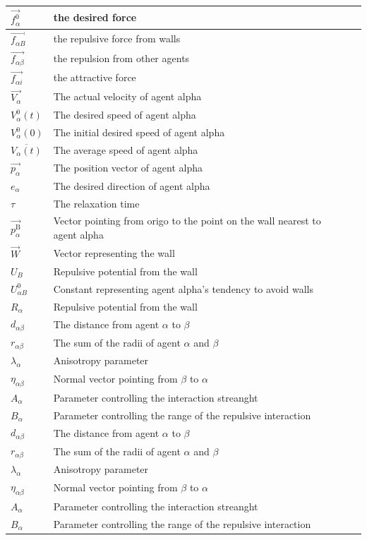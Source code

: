 \begin{center}
\begin{tabular}{lll}
\hline
$\vec{f_{\alpha}^{0}}$ & the desired force &\\
\hline
$\vec{f_{\alpha B}}$ & the repulsive force from walls &\\
\hline
$\vec{f_{\alpha \beta}}$ & the repulsion from other agents\\
\hline
$\vec{f_{\alpha i}}$& the attractive force\\
\hline
$\vec{V_{\alpha}}$ & The actual velocity of agent alpha &\\
\hline
$V_{\alpha}^{0}(t)$ & The desired speed of agent alpha &\\
\hline
$V_{\alpha}^{0}(0)$ & The initial desired speed of agent alpha &\\
\hline
$\overline{V_{\alpha}(t)}$ & The average speed of agent alpha &\\
\hline
$\vec{p_{\alpha}}$ & The position vector of agent alpha\\
\hline
$e_{\alpha}$& The desired direction of agent alpha\\
\hline
$\tau$& The relaxation time &\\
\hline
$\vec{p_{\alpha}^{\text{B}}}$& Vector pointing from origo to the point on the wall nearest to agent alpha &\\
\hline
$\vec{W}$& Vector representing the wall &\\
\hline
$U_{B}$ & Repulsive potential from the wall\\
\hline
$U^{0}_{\alpha B}$ & Constant representing agent alpha's tendency to avoid walls\\
\hline
$R_{\alpha}$& Repulsive potential from the wall\\
\hline
$d_{\alpha \beta}$& The distance from agent $\alpha$ to $\beta$ &\\
\hline
$r_{\alpha\beta}$& The sum of the radii of agent $\alpha$ and $\beta$ \\
\hline
$\lambda_{\alpha}$& Anisotropy parameter &\\
\hline
$\eta_{\alpha \beta}$& Normal vector pointing from $\beta$ to $\alpha$ \\
\hline
$A_{\alpha}$& Parameter controlling the interaction streanght \\
\hline
$B_{\alpha}$& Parameter controlling the range of the repulsive interaction  \\
\hline
$d_{\alpha \beta}$& The distance from agent $\alpha$ to $\beta$ &\\
\hline
$r_{\alpha\beta}$& The sum of the radii of agent $\alpha$ and $\beta$ \\
\hline
$\lambda_{\alpha}$& Anisotropy parameter &\\
\hline
$\eta_{\alpha \beta}$& Normal vector pointing from $\beta$ to $\alpha$ \\
\hline
$A_{\alpha}$& Parameter controlling the interaction streanght \\
\hline
$B_{\alpha}$& Parameter controlling the range of the repulsive interaction  \\
\hline
\end{tabular}
\end{center}

